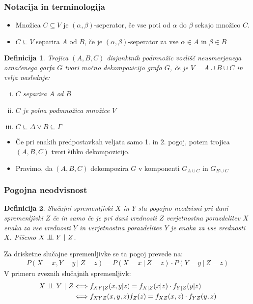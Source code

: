 \documentclass{beamer}
\newtheorem{definicija}{Definicija}
\newcommand{\cond}{\mathrel{\text{\scalebox{1.07}{$\perp\mkern-10mu\perp$}}}}
\begin{document}
\begin{frame}
    \frametitle{Notacija in terminologija}
    \begin{itemize}
        \item Množica $C \subseteq V $ je $ (\alpha, \beta)$-seperator, če vse poti od $\alpha$ do $\beta$ sekajo 
        množico $C$.
        \item $C \subseteq V $ separira $A$ od $B$, če je $ (\alpha, \beta)$-seperator za vse $\alpha \in A$
        in $\beta \in B$
    \end{itemize}
    \begin{definicija}
        Trojica $(A, B, C)$ disjunktnih podmnožic vozlišč neusmerjenega označenega garfa $G$ tvori
        močno dekompozicijo grafa $G$, če je $V = A \cup B \cup C$ in velja naslednje:
        \begin{enumerate}[(i)]
            \item $C$ separira $A$ od $B$
            \item $C$ je polna podmnožica množice $V$
            \item $C \subseteq \Delta \lor B \subseteq \Gamma$
        \end{enumerate}
    \end{definicija}
    \begin{itemize}
        \item Če pri enakih predpostavkah veljata samo 1. in 2. pogoj, potem trojica  $(A, B, C)$
        tvori šibko dekompozicijo.
        \item Pravimo, da $(A, B, C)$ dekompozira $G$ v komponenti $G_{A \cup C}$ 
        in $G_{B \cup C} $
    \end{itemize}

\end{frame}
\begin{frame}
    \frametitle{Pogojna neodvisnost}
    \begin{definicija}
        Slučajni spremenljivki $X$ in $Y$ sta pogojno neodvisni pri dani spremenljivki
        $Z$  če in samo če je pri dani vrednosti $Z$ verjetnostna porazdelitev $X$ enaka
        za vse vrednosti $Y$ in verjetnostna porazdelitev $Y$ je enaka za vse vrednosti
        $X$. Pišemo $ X \cond Y ~|~ Z $. 
    \end{definicija}
    Za drisketne slučajne spremenljivke se ta pogoj prevede na: 
    \begin{align*}
         P(X=x, Y=y ~|~ Z=z) = P(X=x~|~Z=z) \cdot P(Y=y~|~Z=z) 
    \end{align*} 
    V primeru zveznih slučajnih spremenljivk:
    \begin{align*}
        X \cond Y ~|~ Z &\Longleftrightarrow  f_{XY|Z} (x,y|z) = f_{X|Z} (x|z) \cdot f_{Y|Z} (y|z)\\
        &\Longleftrightarrow f_{XYZ} (x,y,z) f_Z(z) = f_{XZ} (x,z) \cdot f_{YZ} (y,z)
    \end{align*}
\end{frame}
\end{document}
